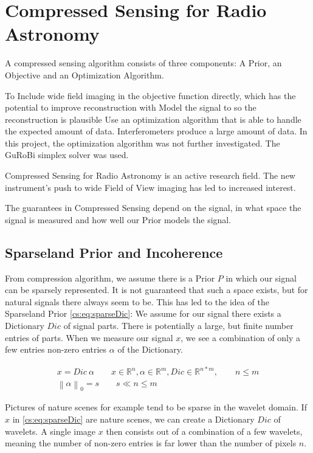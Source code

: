 \section{Compressed Sensing for Radio Astronomy} \label{cs}
A compressed sensing algorithm consists of three components: A Prior, an Objective and an Optimization Algorithm. 

To Include wide field imaging in the objective function directly, which has the potential to improve reconstruction with 
Model the signal to so the reconstruction is plausible
Use an optimization algorithm that is able to handle the expected amount of data. Interferometers produce a large amount of data. In this project, the optimization algorithm was not further investigated. The GuRoBi simplex solver was used.

Compressed Sensing for Radio Astronomy is an active research field. The new instrument's push to wide Field of View imaging has led to increased interest. 

The guarantees in Compressed Sensing depend on the signal, in what space the signal is measured and how well our Prior models the signal. 


\subsection{Sparseland Prior and Incoherence}
From compression algorithm, we assume there is a Prior $P$ in which our signal can be sparsely represented. It is not guaranteed that such a space exists, but for natural signals there always seem to be. This has led to the idea of the Sparseland Prior \eqref{cs:eq:sparseDic}: We assume for our signal there exists a Dictionary $Dic$ of signal parts. There is potentially a large, but finite number entries of parts. When we measure our signal $x$, we see a combination of only a few entries non-zero entries $\alpha$ of the Dictionary. 

\begin{equation} \label{cs:eq:sparseDic}
	\begin{split}
		x = Dic \: \alpha  \qquad  x \in \mathbb{R}^{n}, \alpha \in \mathbb{R}^{m}, Dic \in \mathbb{R}^{n*m}, \qquad n \leq m \\
		\left \| \alpha \right \|_0 = s \qquad s \ll n \leq m
	\end{split}
\end{equation}

Pictures of nature scenes for example tend to be sparse in the wavelet domain. If $x$ in \eqref{cs:eq:sparseDic} are nature scenes, we can create a Dictionary $Dic$ of wavelets. A single image $x$ then consists out of a combination of a few wavelets, meaning the number of non-zero entries is far lower than the number of pixels $n$.

